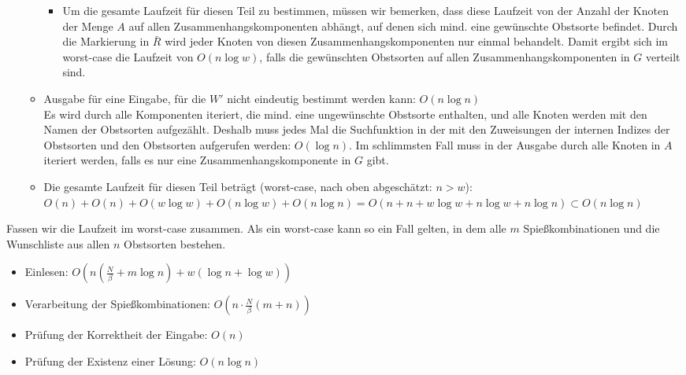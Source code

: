 \begin{itemize}
\begin{itemize}
\begin{itemize}
    \item Um die gesamte Laufzeit für diesen Teil zu bestimmen, müssen wir bemerken, dass 
    diese Laufzeit von der Anzahl der Knoten der Menge $A$ auf allen Zusammenhangskomponenten 
    abhängt, auf denen sich mind. eine gewünschte Obstsorte befindet. Durch die Markierung
    in $\bar{R}$ wird jeder Knoten von diesen Zusammenhangskomponenten nur einmal behandelt. 
    Damit ergibt sich im worst-case die Laufzeit von $O(n \log w)$, falls die gewünschten Obstsorten auf 
    allen Zusammenhangskomponenten in $G$ verteilt sind.
    \end{itemize}

    \item Ausgabe für eine Eingabe, für die $W'$ nicht eindeutig bestimmt werden kann: $O(n \log n)$\\
    Es wird durch alle Komponenten iteriert, die mind. eine ungewünschte Obstsorte enthalten,
    und alle Knoten werden mit den Namen der Obstsorten aufgezählt.
    Deshalb muss jedes Mal die Suchfunktion in der  mit den Zuweisungen 
    der internen Indizes der Obstsorten und den Obstsorten aufgerufen werden: $O(\log n)$.
    Im schlimmsten Fall muss in der Ausgabe durch alle Knoten in $A$ iteriert werden, falls
    es nur eine Zusammenhangskomponente in $G$ gibt.

    \item Die gesamte Laufzeit für diesen Teil beträgt (worst-case, nach oben abgeschätzt: $n > w$):
    $O(n) + O(n) + O(w \log w) + O(n \log w) + O(n \log n) = O(n + n + w \log w + n \log w + n \log n)
    \subset O(n \log n)$
  \end{itemize}

\end{itemize}

Fassen wir die Laufzeit im worst-case zusammen. Als ein worst-case kann so ein Fall gelten,
in dem alle $m$ Spießkombinationen und die Wunschliste aus allen $n$ Obstsorten bestehen. 
\begin{itemize}
  \item Einlesen: $O(n (\frac{N}{\beta} + m \log n) + w (\log n + \log w))$
  \item Verarbeitung der Spießkombinationen: $O(n\cdot \frac{N}{\beta}(m + n))$
  \item Prüfung der Korrektheit der Eingabe: $O(n)$
  \item Prüfung der Existenz einer Lösung: $O(n \log n)$
\end{itemize}


